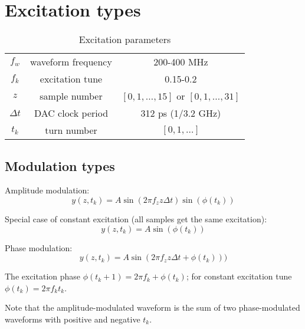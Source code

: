 \documentclass{article}
\begin{document}
\section{Excitation types}


\begin{table}[htdp]
\caption{Excitation parameters}
\begin{center}
\begin{tabular}{|c|c|c|}
\hline
$f_w$ & waveform frequency & 200-400 MHz \\
$f_k$ & excitation tune & 0.15-0.2 \\
$z$ & sample number & $[0, 1, \ldots, 15]$ or $[0, 1, \ldots, 31]$ \\
$\Delta t$ & DAC clock period & 312 ps (1/3.2 GHz) \\
$t_k$ & turn number & $[0, 1, \ldots]$ \\
\hline
\end{tabular}
\end{center}
\label{default}
\end{table}%

\subsection{Modulation types}

Amplitude modulation:
$$y(z,t_k) = A \sin(2\pi f_z z \Delta t)\sin(\phi(t_k))$$

Special case of constant excitation (all samples get the same excitation):
$$y(z,t_k) = A \sin(\phi(t_k))$$

Phase modulation:
$$y(z,t_k) = A \sin(2\pi f_z z \Delta t+\phi(t_k)))$$

The excitation phase $\phi(t_k+1) = 2\pi f_k+\phi(t_k)$; for constant excitation tune $\phi(t_k) = 2\pi f_k t_k$.

Note that the amplitude-modulated waveform is the sum of two phase-modulated waveforms with positive and negative $t_k$.
%
\end{document}
